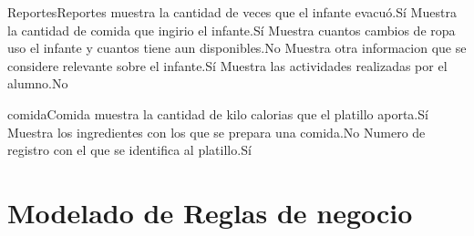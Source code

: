 \begin{cdtEntidad}{Reportes}{Reportes}
		{muestra la cantidad de veces que el infante evacuó.}{Sí}
		{Muestra la cantidad de comida que ingirio el infante.}{Sí}
		{Muestra cuantos cambios de ropa uso el infante y cuantos tiene aun disponibles.}{No}
		{Muestra otra informacion que se considere relevante sobre el infante.}{Sí}
		{Muestra las actividades realizadas por el alumno.}{No}
\end{cdtEntidad}

\begin{cdtEntidad}{comida}{Comida}
		{muestra la cantidad de kilo calorias que el platillo aporta.}{Sí}
		{Muestra los ingredientes con los que se prepara una comida.}{No}
		{Numero de registro con el que se identifica al platillo.}{Sí}
\end{cdtEntidad}
\newpage
\section{Modelado de Reglas de negocio}



